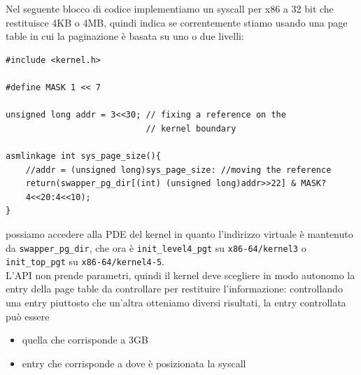 \documentclass[12pt, oneside]{extbook}
\begin{document}
Nel seguente blocco di codice implementiamo un syscall per x86 a 32 bit che restituisce 4KB o 4MB, quindi indica se correntemente stiamo usando una page table in cui la paginazione è basata su uno o due livelli:
\begin{lstlisting}
#include <kernel.h>

#define MASK 1 << 7

unsigned long addr = 3<<30;	// fixing a reference on the
							// kernel boundary

asmlinkage int sys_page_size(){
	//addr = (unsigned long)sys_page_size: //moving the reference
	return(swapper_pg_dir[(int) (unsigned long)addr>>22] & MASK?
	4<<20:4<<10);
}
\end{lstlisting}
possiamo accedere alla PDE del kernel in quanto l'indirizzo virtuale è mantenuto da \texttt{swapper\_pg\_dir}, che ora è \texttt{init\_level4\_pgt} su \texttt{x86-64/kernel3} o \texttt{init\_top\_pgt} su \texttt{x86-64/kernel4-5}.\\L'API non prende parametri, quindi il kernel deve scegliere in modo autonomo la entry della page table da controllare per restituire l'informazione: controllando una entry piuttosto che un'altra otteniamo diversi risultati, la entry controllata può essere
\begin{itemize}
\item quella che corrisponde a 3GB
\item entry che corrisponde a dove è posizionata la syscall
\end{itemize}
\end{document}
